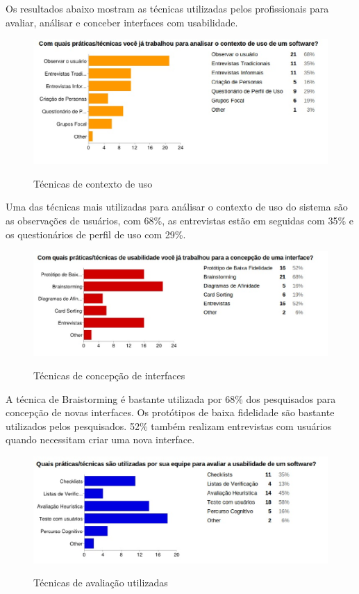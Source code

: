 \newpage

	Os resultados abaixo mostram as técnicas utilizadas pelos profissionais para avaliar, análisar e conceber interfaces com usabilidade.
	
	\begin{figure}[!h]
    	\centering
    	\includegraphics[keepaspectratio=true,scale=0.55]
      		{figuras/contexto_uso.eps}
    	\label{concepcao}
		\caption{Técnicas de contexto de uso}
	\end{figure}
	
	Uma das técnicas mais utilizadas para análisar o contexto de uso do sistema são as observações de usuários, com 68\%, as entrevistas estão em seguidas com 35\% e os questionários de perfil de uso com 29\%.
	
	\begin{figure}[!h]
    	\centering
    	\includegraphics[keepaspectratio=true,scale=0.55]
      		{figuras/tecnica_concepcao.eps}
    	\label{concepcao}
		\caption{Técnicas de concepção de interfaces}
	\end{figure}
	
	A técnica de Braistorming é bastante utilizada por 68\% dos pesquisados para concepção de novas interfaces. Os protótipos de baixa fidelidade são bastante utilizados pelos pesquisados. 52\% também realizam entrevistas com usuários quando necessitam criar uma nova interface.
		
	\begin{figure}[!h]
    	\centering
    	\includegraphics[keepaspectratio=true,scale=0.55]
      		{figuras/avaliacao_usada.eps}
    	\label{concepcao}
		\caption{Técnicas de avaliação utilizadas}
	\end{figure}	
	
